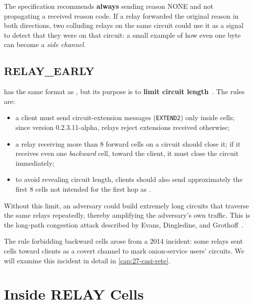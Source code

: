 \begin{attenzione}
The specification recommends \textbf{always} sending reason NONE and not propagating a received reason code. If a relay forwarded the original reason in both directions, two colluding relays on the same circuit could use it as a signal to detect that they were on that circuit: a small example of how even one byte can become a \emph{side channel}.
\end{attenzione}

\subsection{RELAY\_EARLY}

 has the same format as , but its purpose is to \textbf{limit circuit length}~. The rules are:
\begin{itemize}
  \item a client must send circuit-extension messages (\texttt{EXTEND2}) only inside  cells; since version 0.2.3.11-alpha, relays reject extensions received otherwise;
  \item a relay receiving more than 8 forward  cells on a circuit should close it; if it receives even one \emph{backward} cell, toward the client, it must close the circuit immediately;
  \item to avoid revealing circuit length, clients should also send approximately the first 8 cells not intended for the first hop as .
\end{itemize}
Without this limit, an adversary could build extremely long circuits that traverse the same relays repeatedly, thereby amplifying the adversary's own traffic. This is the long-path congestion attack described by Evans, Dingledine, and Grothoff~\cite{evans2009congestion}.

\begin{storia}
The rule forbidding backward  cells arose from a 2014 incident: some relays sent  cells toward clients as a covert channel to mark onion-service users' circuits. We will examine this incident in detail in \cref{cap:27-casi-rete}.
\end{storia}

\section{Inside RELAY Cells}\label{sec:relay}

